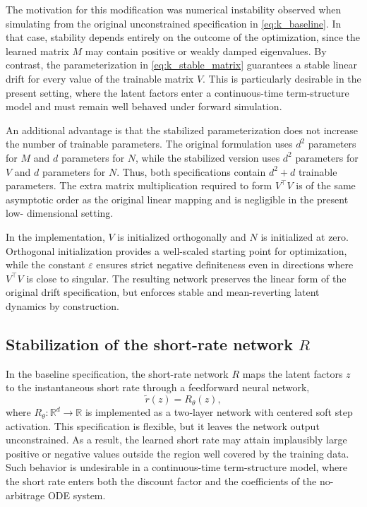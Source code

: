 The motivation for this modification was numerical instability observed when simulating
from the original unconstrained specification in \eqref{eq:k_baseline}. In that case,
stability depends entirely on the outcome of the optimization, since the learned matrix
$M$ may contain positive or weakly damped eigenvalues. By contrast, the parameterization
in \eqref{eq:k_stable_matrix} guarantees a stable linear drift for every value of the
trainable matrix $V$. This is particularly desirable in the present setting, where the
latent factors enter a continuous-time term-structure model and must remain well behaved
under forward simulation.

An additional advantage is that the stabilized parameterization does not increase the
number of trainable parameters. The original formulation uses $d^2$ parameters for $M$
and $d$ parameters for $N$, while the stabilized version uses $d^2$ parameters for $V$
and $d$ parameters for $N$. Thus, both specifications contain $d^2+d$ trainable
parameters. The extra matrix multiplication required to form $V^\top V$ is of the same
asymptotic order as the original linear mapping and is negligible in the present low-
dimensional setting.

In the implementation, $V$ is initialized orthogonally and $N$ is initialized at zero.
Orthogonal initialization provides a well-scaled starting point for optimization, while
the constant $\varepsilon$ ensures strict negative definiteness even in directions where
$V^\top V$ is close to singular. The resulting network preserves the linear form of the
original drift specification, but enforces stable and mean-reverting latent dynamics by
construction.

\subsection{Stabilization of the short-rate network $R$}

In the baseline specification, the short-rate network $R$ maps the latent factors $z$ to
the instantaneous short rate through a feedforward neural network,
\begin{equation}
\tilde r(z) = R_\theta(z),
\label{eq:r_baseline}
\end{equation}
where $R_\theta : \mathbb{R}^d \to \mathbb{R}$ is implemented as a two-layer network with
centered soft step activation. This specification is flexible, but it leaves the network
output unconstrained. As a result, the learned short rate may attain implausibly large
positive or negative values outside the region well covered by the training data. Such
behavior is undesirable in a continuous-time term-structure model, where the short rate
enters both the discount factor and the coefficients of the no-arbitrage ODE system.

